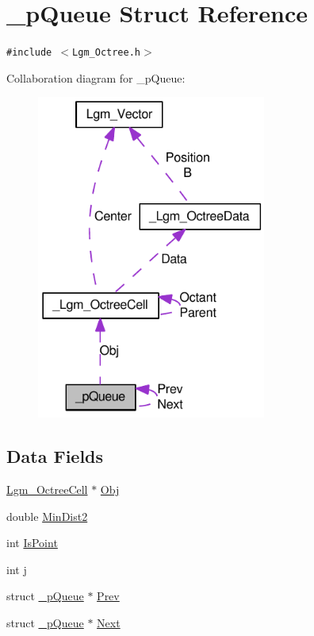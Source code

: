\hypertarget{struct__p_queue}{
\section{\_\-pQueue Struct Reference}
\label{struct__p_queue}
}
{\tt \#include $<$Lgm\_\-Octree.h$>$}

Collaboration diagram for \_\-pQueue:\nopagebreak
\begin{figure}[H]
\begin{center}
\leavevmode
\includegraphics[width=214pt]{struct__p_queue__coll__graph}
\end{center}
\end{figure}
\subsection*{Data Fields}
\begin{CompactItemize}
\item 
\hyperlink{struct___lgm___octree_cell}{Lgm\_\-OctreeCell} $\ast$ \hyperlink{struct__p_queue_7530efafe5945a266bf8383ae47c7228}{Obj}
\item 
double \hyperlink{struct__p_queue_fcb495567b98cde535c5239b17681f62}{MinDist2}
\item 
int \hyperlink{struct__p_queue_270a4dbd002743db25f63825195e4006}{IsPoint}
\item 
int \hyperlink{struct__p_queue_37d972ae0b47b9099e30983131d31916}{j}
\item 
struct \hyperlink{struct__p_queue}{\_\-pQueue} $\ast$ \hyperlink{struct__p_queue_4717220aafe87eeda3986b3a258a2a2a}{Prev}
\item 
struct \hyperlink{struct__p_queue}{\_\-pQueue} $\ast$ \hyperlink{struct__p_queue_3a316f1387f6ede290905c4d79962b17}{Next}
\end{CompactItemize}


